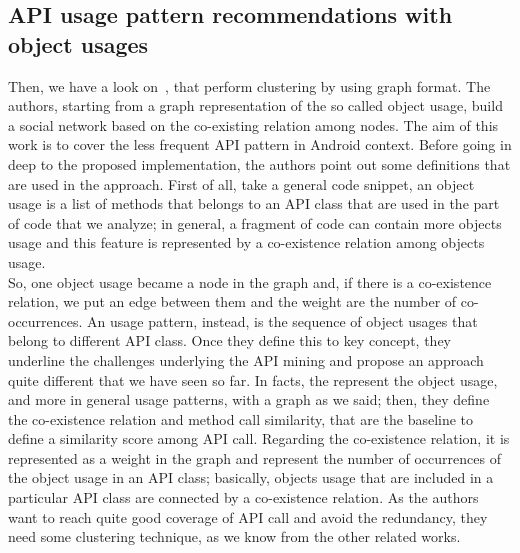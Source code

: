 \subsection{API usage pattern recommendations with object usages}
Then, we have a look on~\cite{niu_api_2017}, that perform clustering by using graph format. The authors, starting from a graph representation of the so called object usage, build a social network based on the co-existing relation among nodes. The aim of this work is to cover the less frequent API pattern in Android context. Before going in deep to the proposed implementation, the authors point out some definitions that are used in the approach. First of all, take a general code snippet, an object usage is a list of methods that belongs to an API class that are used in the part of code that we analyze; in general, a fragment of code can contain more objects usage and this feature is represented by a co-existence relation among objects usage. \\
So, one object usage became a node in the graph and, if there is a co-existence relation, we put an edge between them and the weight are the number of co-occurrences. An usage pattern, instead, is the sequence of object usages that belong to different API class. Once they define this to key concept, they underline the challenges underlying the API mining and propose an approach quite different that we have seen so far. In facts, the represent the object usage, and more in general usage patterns, with a graph as we said; then, they define the co-existence relation and method call similarity, that are the baseline to define a similarity score among API call. Regarding the co-existence relation, it is represented as a weight in the graph and represent the number of occurrences of the object usage in an API class; basically, objects usage that are included in a particular API class are connected by a co-existence relation. As the authors want to reach quite good coverage of API call and avoid the redundancy, they need some clustering technique, as we know from the other related works. \newline
